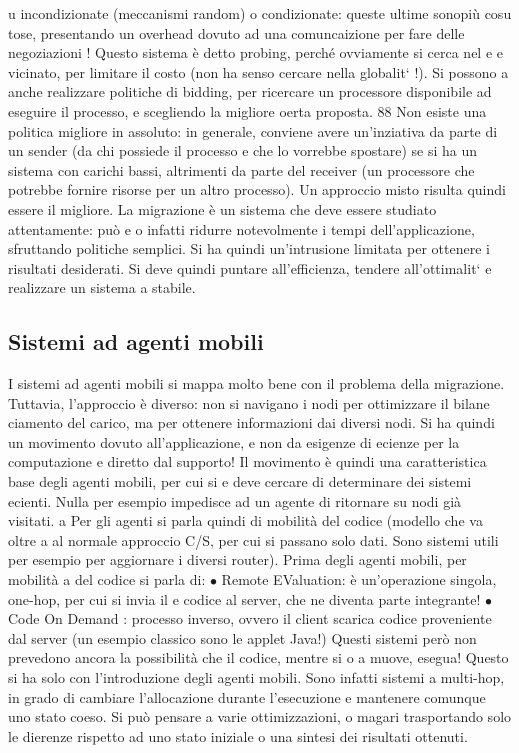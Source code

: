 \documentclass[a4paper,12pt]{article}
\begin{document}
u
incondizionate (meccanismi random) o condizionate: queste ultime sonopiù cosu
tose, presentando un overhead dovuto ad una comuncaizione per fare delle negoziazioni ! Questo sistema è detto probing,
perché ovviamente si cerca nel
e
e
vicinato, per limitare il costo (non ha senso cercare nella globalit` !). Si possono
a
anche realizzare politiche di bidding, per ricercare un processore disponibile ad
eseguire il processo, e scegliendo la migliore oerta proposta.
88
Non esiste una politica migliore in assoluto: in generale, conviene avere
un'inziativa da parte di un sender (da chi possiede il processo e che lo vorrebbe
spostare) se si ha un sistema con carichi bassi, altrimenti da parte del receiver
(un processore che potrebbe fornire risorse per un altro processo). Un approccio
misto risulta quindi essere il migliore.
La migrazione è un sistema che deve essere studiato attentamente: può
e
o
infatti ridurre notevolmente i tempi dell'applicazione, sfruttando politiche semplici. Si ha quindi un'intrusione
limitata per ottenere i risultati desiderati. Si
deve quindi puntare all'efficienza, tendere all'ottimalit` e realizzare un sistema
a
stabile.
\subsection{Sistemi ad agenti mobili}
I sistemi ad agenti mobili si mappa molto bene con il problema della migrazione.
Tuttavia, l'approccio è diverso: non si navigano i nodi per ottimizzare il bilane
ciamento del carico, ma per ottenere informazioni dai diversi nodi. Si ha quindi
un movimento dovuto all'applicazione, e non da esigenze di ecienze per la
computazione e diretto dal supporto!
Il movimento è quindi una caratteristica base degli agenti mobili, per cui si
e
deve cercare di determinare dei sistemi ecienti. Nulla per esempio impedisce
ad un agente di ritornare su nodi già visitati.
a
Per gli agenti si parla quindi di mobilità del codice (modello che va oltre
a
al normale approccio C/S, per cui si passano solo dati. Sono sistemi utili per
esempio per aggiornare i diversi router). Prima degli agenti mobili, per mobilità
a
del codice si parla di:
$\bullet$ Remote EValuation: è un'operazione singola, one-hop, per cui si invia il
e
codice al server, che ne diventa parte integrante!
$\bullet$ Code On Demand : processo inverso, ovvero il client scarica codice proveniente dal server (un esempio classico
sono le applet Java!)
Questi sistemi però non prevedono ancora la possibilità che il codice, mentre si
o
a
muove, esegua! Questo si ha solo con l'introduzione degli agenti mobili. Sono infatti sistemi a multi-hop, in grado di
cambiare l'allocazione durante l'esecuzione
e mantenere comunque uno stato coeso. Si può pensare a varie ottimizzazioni,
o
magari trasportando solo le dierenze rispetto ad uno stato iniziale o una sintesi
dei risultati ottenuti.
\end{document}
